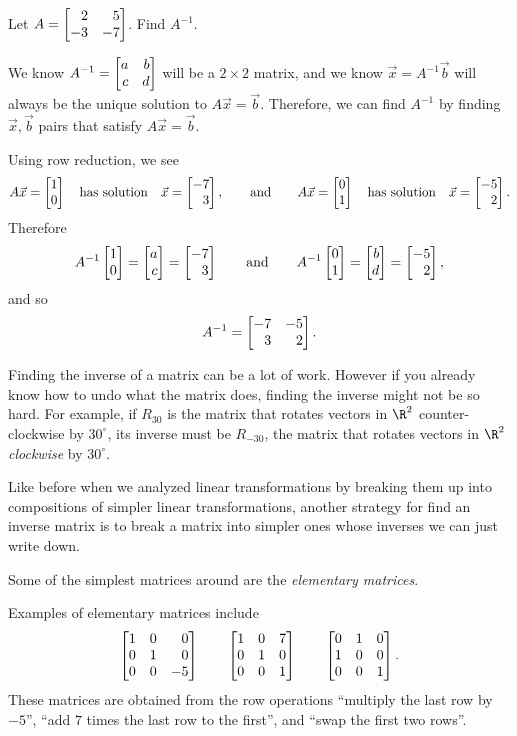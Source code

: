 \begin{example}
	Let $A=\mat{2&5\\-3&-7}$. Find $A^{-1}$.

	We know $A^{-1}=\mat{a&b\\c&d}$ will be a $2\times 2$ matrix, and we know $\vec x=A^{-1}\vec b$ will always
	be the unique solution to $A\vec x=\vec b$. Therefore, we can find $A^{-1}$ by finding $\vec x,\vec b$ pairs that
	satisfy $A\vec x=\vec b$.

	Using row reduction, we see
	\[
		A\vec x=\mat{1\\0}\quad\text{has solution}\quad \vec x=\mat{-7\\3}, 
		\qquad\text{and}
		\qquad
		A\vec x=\mat{0\\1}\quad\text{has solution}\quad \vec x=\mat{-5\\2}.
	\]
	Therefore
	\[
		A^{-1}\mat{1\\0}=\mat{a\\c}=\mat{-7\\3}\qquad \text{and}\qquad
		A^{-1}\mat{0\\1}=\mat{b\\d}=\mat{-5\\2},
	\]
	and so
	\[
		A^{-1}=\mat{-7&-5\\3&2}.
	\]
\end{example}


Finding the inverse of a matrix can be a lot of work. However
if you already know how to undo what the matrix does, finding the inverse might not be so hard. For example, 
if $R_{30}$ is the matrix that rotates vectors in $\R^2$ counter-clockwise by $30^\circ$, its inverse must be
$R_{-30}$, the matrix that rotates vectors in $\R^2$ \emph{clockwise} by $30^\circ$.

Like before when we analyzed linear transformations by breaking them up into compositions
of simpler linear transformations, another strategy for find an inverse matrix is to break a matrix
into simpler ones whose inverses we can just write down.

Some of the simplest matrices around are the \emph{elementary matrices}.


Examples of elementary matrices include
\[
	\mat{1&0&0\\0&1&0\\0&0&-5}\qquad
	\mat{1&0&7\\0&1&0\\0&0&1}\qquad
	\mat{0&1&0\\1&0&0\\0&0&1}.
\]
These matrices are obtained from the row operations ``multiply the last row by $-5$'', ``add $7$ times the last row to the first'',
and ``swap the first two rows''.

